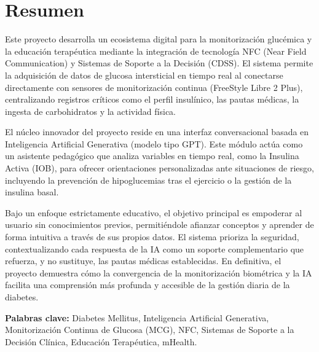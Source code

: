 \chapter*{Resumen}
Este proyecto desarrolla un ecosistema digital para la monitorización glucémica y la educación terapéutica mediante la integración de tecnología NFC (Near Field Communication) y Sistemas de Soporte a la Decisión (CDSS). El sistema permite la adquisición de datos de glucosa intersticial en tiempo real al conectarse directamente con sensores de monitorización continua (FreeStyle Libre 2 Plus), centralizando registros críticos como el perfil insulínico, las pautas médicas, la ingesta de carbohidratos y la actividad física.

El núcleo innovador del proyecto reside en una interfaz conversacional basada en Inteligencia Artificial Generativa (modelo tipo GPT). Este módulo actúa como un asistente pedagógico que analiza variables en tiempo real, como la Insulina Activa (IOB), para ofrecer orientaciones personalizadas ante situaciones de riesgo, incluyendo la prevención de hipoglucemias tras el ejercicio o la gestión de la insulina basal.

Bajo un enfoque estrictamente educativo, el objetivo principal es empoderar al usuario sin conocimientos previos, permitiéndole afianzar conceptos y aprender de forma intuitiva a través de sus propios datos. El sistema prioriza la seguridad, contextualizando cada respuesta de la IA como un soporte complementario que refuerza, y no sustituye, las pautas médicas establecidas. En definitiva, el proyecto demuestra cómo la convergencia de la monitorización biométrica y la IA facilita una comprensión más profunda y accesible de la gestión diaria de la diabetes.
\vspace{.5cm}

\textbf{Palabras clave:} Diabetes Mellitus, Inteligencia Artificial Generativa, Monitorización Continua de Glucosa (MCG), NFC, Sistemas de Soporte a la Decisión Clínica, Educación Terapéutica, mHealth.